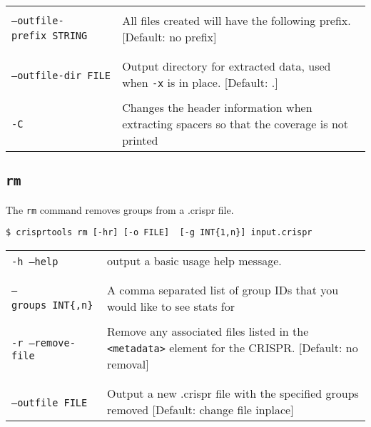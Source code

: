 \documentclass[11pt]{article} %
\newcommand{\crispr}{CRISPR}
\newcommand{\optionflag}[1]{\texttt{-#1}}
\newcommand{\optionflagarg}[2]{\optionflag{#1}\ \texttt{#2}}
\newcommand{\longoptionflag}[1]{\texttt{--#1}}
\newcommand{\longoptionflagarg}[2]{\longoptionflag{#1}\ \texttt{#2}}
\newcommand{\combinedoptionflag}[2]{\optionflag{#1}\ \longoptionflag{#2}}
\newcommand{
	\combinedoptionflagarg}[3]{
		\shortstack[l]{
			\optionflagarg{#1}{#3} \\ \longoptionflagarg{#2}{#3}
		}
	}
\begin{document}
\begin{longtable}{  l    p{10cm} }
\combinedoptionflagarg{o}{outfile-prefix}{STRING} & All files created will have the following prefix. [Default: no prefix] \\ \\
\combinedoptionflagarg{O}{outfile-dir}{FILE} & Output directory for extracted data, used when \optionflag{x} is in place. [Default: .]\\ \\
\optionflag{C} & Changes the header information when extracting spacers so that the coverage is not printed \\

\end{longtable}
\subsection{\lstinline$rm$}
\label{sec:ctrm}
The \texttt{rm} command removes groups from a .crispr file.
\begin{lstlisting}
$ crisprtools rm [-hr] [-o FILE]  [-g INT{1,n}] input.crispr
\end{lstlisting}
 \begin{longtable}{  l    p{10cm} }

 \combinedoptionflag{h}{help} & output a basic usage help message. \\ \\
\combinedoptionflagarg{g}{groups}{INT\{,n\}} & A comma separated list of group IDs that you would like to see stats for \\ \\
\combinedoptionflag{r}{remove-file} & Remove any associated files listed in the \lstinline[language=XML_new]$<metadata>$ element for the \crispr. [Default: no removal] \\ \\
\combinedoptionflagarg{o}{outfile}{FILE} & Output a new .crispr file with the specified groups removed [Default: change file inplace] \\ 

\end{longtable}
\end{document}

